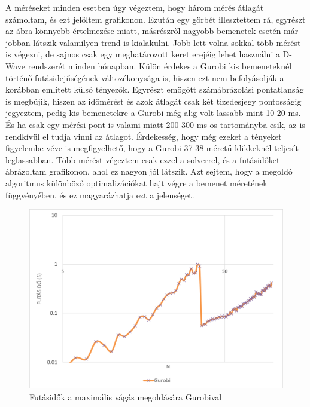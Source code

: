 A méréseket minden esetben úgy végeztem, hogy három mérés átlagát számoltam, és ezt jelöltem grafikonon. Ezután egy görbét illesztettem rá, egyrészt az ábra könnyebb értelmezése miatt, másrészről nagyobb bemenetek esetén már jobban látszik valamilyen trend is kialakulni. Jobb lett volna sokkal több mérést is végezni, de sajnos csak egy meghatározott keret erejéig lehet használni a D-Wave rendszerét minden hónapban. Külön érdekes a Gurobi kis bemeneteknél történő futásidejűségének változékonysága is, hiszen ezt nem befolyásolják a korábban említett külső tényezők. Egyrészt emögött számábrázolási pontatlanság is megbújik, hiszen az időmérést és azok átlagát csak két tizedesjegy pontosságig jegyeztem, pedig kis bemenetekre a Gurobi még alig volt lassabb mint 10-20 ms. És ha csak egy mérési pont is valami miatt 200-300 ms-os tartományba esik, az is rendkívül el tudja vinni az átlagot. Érdekesség, hogy még ezeket a tényeket figyelembe véve is megfigyelhető, hogy a Gurobi 37-38 méretű klikkeknél teljesít leglassabban. Több mérést végeztem csak ezzel a solverrel, és a futásidőket ábrázoltam  grafikonon, ahol ez nagyon jól látszik. Azt sejtem, hogy a megoldó algoritmus különböző optimalizációkat hajt végre a bemenet méretének függvényében, és ez magyarázhatja ezt a jelenséget.

\begin{figure}[!ht]
	\centering
	\includegraphics[width=150mm, keepaspectratio]{figures/diagrams/Gurobi_runtimes.png}
	\caption{Futásidők a maximális vágás megoldására Gurobival}
	\label{fig:maxCutGurobiRuntimes}
\end{figure}

